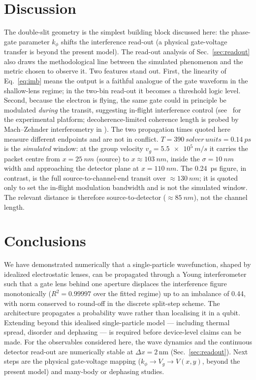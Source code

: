 \documentclass[11pt,a4paper]{article}
\newcommand{\kphi}{k_\phi}
\begin{document}
\section{Discussion}
\label{sec:disc}

The double-slit geometry is the simplest building block discussed here: the
phase-gate parameter $\kphi$ shifts the interference read-out (a physical
gate-voltage transfer is beyond the present model). The read-out analysis of
Sec.~\ref{sec:readout} also draws the methodological line between the
simulated phenomenon and the metric chosen to observe it. Two features stand out. First, the linearity of Eq.~\eqref{eq:imb} means the
output is a faithful analogue of the gate waveform in the shallow-lens regime; in
the two-bin read-out it becomes a threshold logic level. Second, because the
electron is flying, the same gate could in principle be modulated \emph{during}
the transit, suggesting in-flight interference control (see~\cite{ji} for the
experimental platform; decoherence-limited coherence length is probed by
Mach--Zehnder interferometry in \cite{roulleau}). The two propagation times quoted here measure
different endpoints and are not in conflict. $T=\SI{390}{solver\,units}=\SI{0.14}{ps}$
is the \emph{simulated} window: at the group velocity
$v_g=\SI{5.5e5}{m/s}$ it carries the packet centre from
$x=\SI{25}{nm}$ (source) to $x\approx\SI{103}{nm}$, inside the
$\sigma=\SI{10}{nm}$ width and approaching the detector plane at
$x=\SI{110}{nm}$. The \SI{0.24}{ps} figure, in contrast, is the full
source-to-channel-end transit over $\approx\SI{130}{nm}$; it is quoted only to
set the in-flight modulation bandwidth and is not the simulated window. The
relevant distance is therefore source-to-detector ($\approx\SI{85}{nm}$), not
the channel length.

\section{Conclusions}
\label{sec:concl}

We have demonstrated numerically that a single-particle wavefunction, shaped by
idealized electrostatic lenses, can be propagated through a Young interferometer
such that a gate lens behind one aperture displaces the interference figure
monotonically ($R^2 = 0.99997$ over the fitted regime) up to an imbalance of
0.44, with norm conserved to round-off in the discrete split-step scheme. The
architecture propagates a probability wave rather than localising it in a
qubit. Extending beyond this idealised single-particle model --- including
thermal spread, disorder and dephasing --- is required before device-level claims
can be made. For the observables considered here, the wave dynamics and the
continuous detector read-out are numerically stable at $\Delta x = 2$\,nm
(Sec.~\ref{sec:readout}). Next steps are the physical gate-voltage mapping
($\kphi \rightarrow V_g \rightarrow V(x,y)$, beyond the present model) and
many-body or dephasing studies.
\end{document}
